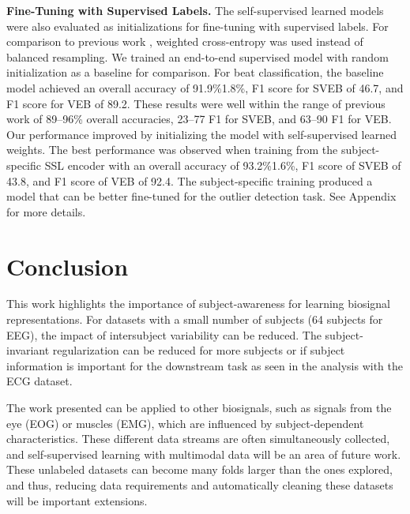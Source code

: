 \documentclass{article}
\renewcommand{\paragraph}[1]{\textbf{#1}\hspace{1em}}
\begin{document}
\paragraph{Fine-Tuning with Supervised Labels.} The self-supervised learned
models were also evaluated as initializations for fine-tuning with supervised
labels. For comparison to previous work \cite{de_chazal_automatic_2004,huang_new_2014,garcia_inter-patient_2017,xu_towards_2019,niu_inter-patient_2019}, weighted
cross-entropy was used \cite{cui_class-balanced_2019} instead of balanced
resampling. We trained an end-to-end supervised model with random initialization
as a baseline for comparison. For beat classification, the baseline model
achieved an overall accuracy of 91.9\%1.8\%, F1 score for SVEB of 46.7, and
F1 score for VEB of 89.2. These results were well within the range of previous
work
\cite{de_chazal_automatic_2004,huang_new_2014,garcia_inter-patient_2017,xu_towards_2019,niu_inter-patient_2019}
of 89--96\% overall accuracies, 23--77 F1 for SVEB, and 63--90 F1 for
VEB. Our performance improved by initializing the model with self-supervised
learned weights. The best performance was observed when training from the
subject-specific SSL encoder with an overall accuracy of 93.2\%1.6\%, F1
score of SVEB of 43.8, and F1 score of VEB of 92.4. The subject-specific
training produced a model that can be better fine-tuned for the outlier
detection task. See Appendix for more details.
  

\section{Conclusion}

This work highlights the importance of subject-awareness for learning biosignal
representations. For datasets with a small number of subjects (64 subjects
for EEG), the impact of intersubject variability can be reduced. The
subject-invariant regularization can be reduced for more subjects or if subject
information is important for the downstream task as seen in the analysis with
the ECG dataset.

The work presented can be applied to other biosignals, such as signals from the
eye (EOG) or muscles (EMG), which are influenced by subject-dependent
characteristics. These different data streams are often simultaneously
collected, and self-supervised learning with multimodal data will be an area of
future work. These unlabeled datasets can become many folds larger than the ones
explored, and thus, reducing data requirements and automatically cleaning these
datasets will be important extensions.
\end{document}
